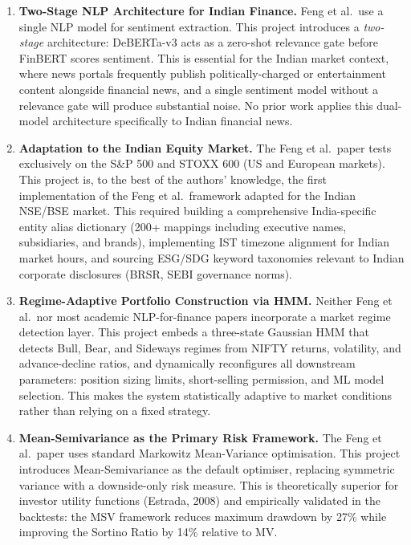 \documentclass[12pt, a4paper]{article}
\begin{document}
\begin{enumerate}[leftmargin=2em, itemsep=6pt]

    \item \textbf{Two-Stage NLP Architecture for Indian Finance.}
    Feng et al.\ use a single NLP model for sentiment extraction. This project introduces a \textit{two-stage} architecture: DeBERTa-v3 acts as a zero-shot relevance gate before FinBERT scores sentiment. This is essential for the Indian market context, where news portals frequently publish politically-charged or entertainment content alongside financial news, and a single sentiment model without a relevance gate will produce substantial noise. No prior work applies this dual-model architecture specifically to Indian financial news.

    \item \textbf{Adaptation to the Indian Equity Market.}
    The Feng et al.\ paper tests exclusively on the S\&P 500 and STOXX 600 (US and European markets). This project is, to the best of the authors' knowledge, the first implementation of the Feng et al.\ framework adapted for the Indian NSE/BSE market. This required building a comprehensive India-specific entity alias dictionary (200+ mappings including executive names, subsidiaries, and brands), implementing IST timezone alignment for Indian market hours, and sourcing ESG/SDG keyword taxonomies relevant to Indian corporate disclosures (BRSR, SEBI governance norms).

    \item \textbf{Regime-Adaptive Portfolio Construction via HMM.}
    Neither Feng et al.\ nor most academic NLP-for-finance papers incorporate a market regime detection layer. This project embeds a three-state Gaussian HMM that detects Bull, Bear, and Sideways regimes from NIFTY returns, volatility, and advance-decline ratios, and dynamically reconfigures all downstream parameters: position sizing limits, short-selling permission, and ML model selection. This makes the system statistically adaptive to market conditions rather than relying on a fixed strategy.

    \item \textbf{Mean-Semivariance as the Primary Risk Framework.}
    The Feng et al.\ paper uses standard Markowitz Mean-Variance optimisation. This project introduces Mean-Semivariance as the default optimiser, replacing symmetric variance with a downside-only risk measure. This is theoretically superior for investor utility functions (Estrada, 2008) and empirically validated in the backtests: the MSV framework reduces maximum drawdown by 27\% while improving the Sortino Ratio by 14\% relative to MV.


\end{enumerate}
\end{document}
